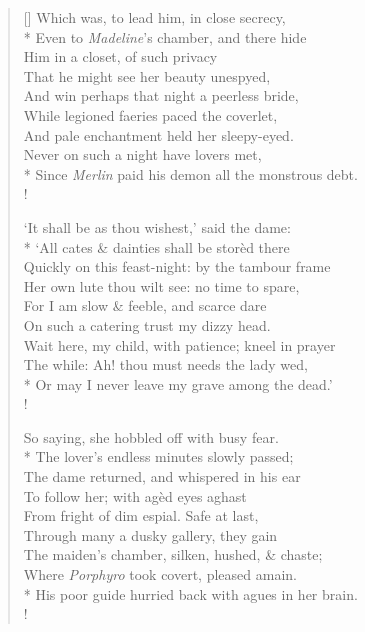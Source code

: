 \documentclass[MAIN]{subfiles}
\begin{document}
\begin{verse}[\versewidth]
\vin Which was, to lead him, in close secrecy,\\*
\vin Even to \emph{Madeline}'s chamber, and there hide\\
\vin Him in a closet, of such privacy\\
\vin That he might see her beauty unespyed,\\
\vin And win perhaps that night a peerless bride,\\
\vin While legioned faeries paced the coverlet,\\
\vin And pale enchantment held her sleepy-eyed.\\
\vin Never on such a night have lovers met,\\*
Since \emph{Merlin} paid his demon all the monstrous debt.\\!

\vin `It shall be as thou wishest,' said the dame:\\*
\vin `All cates \& dainties shall be stor\`ed there\\
\vin Quickly on this feast-night: by the tambour frame\\
\vin Her own lute thou wilt see: no time to spare,\\
\vin For I am slow \& feeble, and scarce dare\\
\vin On such a catering trust my dizzy head.\\
\vin Wait here, my child, with patience; kneel in prayer\\
\vin The while: Ah! thou must needs the lady wed,\\*
Or may I never leave my grave among the dead.'\\!

\vin So saying, she hobbled off with busy fear.\\*
\vin The lover's endless minutes slowly passed;\\
\vin The dame returned, and whispered in his ear\\
\vin To follow her; with ag\`ed eyes aghast\\
\vin From fright of dim espial. Safe at last,\\
\vin Through many a dusky gallery, they gain\\
\vin The maiden's chamber, silken, hushed, \& chaste;\\
\vin Where \emph{Porphyro} took covert, pleased amain.\\*
His poor guide hurried back with agues in her brain.\\!


\end{verse}
\end{document}
